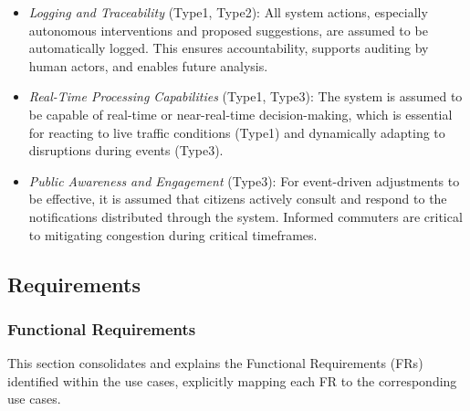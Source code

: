 \documentclass[a4paper,12pt]{article}
\begin{document}
\begin{itemize}
    \item \textit{Logging and Traceability} (Type1, Type2): All system actions, especially autonomous interventions and proposed suggestions, are assumed to be automatically logged. This ensures accountability, supports auditing by human actors, and enables future analysis.

    \item \textit{Real-Time Processing Capabilities} (Type1, Type3): The system is assumed to be capable of real-time or near-real-time decision-making, which is essential for reacting to live traffic conditions (Type1) and dynamically adapting to disruptions during events (Type3).

    \item \textit{Public Awareness and Engagement} (Type3): For event-driven adjustments to be effective, it is assumed that citizens actively consult and respond to the notifications distributed through the system. Informed commuters are critical to mitigating congestion during critical timeframes.
    
\end{itemize}

\newpage

\subsection{Requirements}

\subsubsection{Functional Requirements}

This section consolidates and explains the Functional Requirements (FRs) identified within the use cases, explicitly mapping each FR to the corresponding use cases. \\
\end{document}
